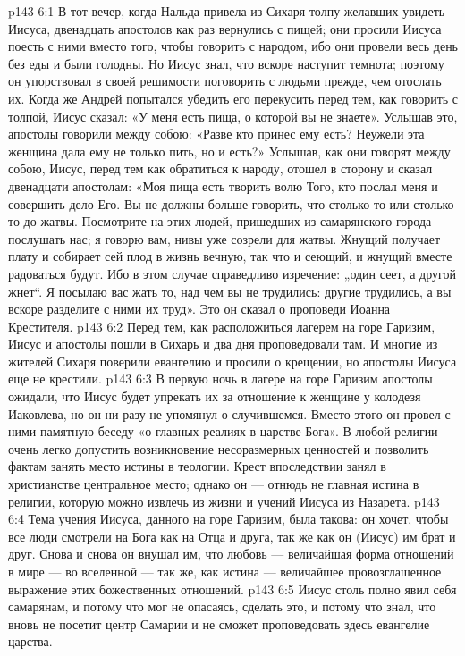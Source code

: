 \vs p143 6:1 В тот вечер, когда Нальда привела из Сихаря толпу желавших увидеть Иисуса, двенадцать апостолов как раз вернулись с пищей; они просили Иисуса поесть с ними вместо того, чтобы говорить с народом, ибо они провели весь день без еды и были голодны. Но Иисус знал, что вскоре наступит темнота; поэтому он упорствовал в своей решимости поговорить с людьми прежде, чем отослать их. Когда же Андрей попытался убедить его перекусить перед тем, как говорить с толпой, Иисус сказал: «У меня есть пища, о которой вы не знаете». Услышав это, апостолы говорили между собою: «Разве кто принес ему есть? Неужели эта женщина дала ему не только пить, но и есть?» Услышав, как они говорят между собою, Иисус, перед тем как обратиться к народу, отошел в сторону и сказал двенадцати апостолам: «Моя пища есть творить волю Того, кто послал меня и совершить дело Его. Вы не должны больше говорить, что столько\hyp{}то или столько\hyp{}то до жатвы. Посмотрите на этих людей, пришедших из самарянского города послушать нас; я говорю вам, нивы уже созрели для жатвы. Жнущий получает плату и собирает сей плод в жизнь вечную, так что и сеющий, и жнущий вместе радоваться будут. Ибо в этом случае справедливо изречение: „один сеет, а другой жнет“. Я посылаю вас жать то, над чем вы не трудились: другие трудились, а вы вскоре разделите с ними их труд». Это он сказал о проповеди Иоанна Крестителя.
\vs p143 6:2 Перед тем, как расположиться лагерем на горе Гаризим, Иисус и апостолы пошли в Сихарь и два дня проповедовали там. И многие из жителей Сихаря поверили евангелию и просили о крещении, но апостолы Иисуса еще не крестили.
\vs p143 6:3 \pc В первую ночь в лагере на горе Гаризим апостолы ожидали, что Иисус будет упрекать их за отношение к женщине у колодезя Иаковлева, но он ни разу не упомянул о случившемся. Вместо этого он провел с ними памятную беседу «о главных реалиях в царстве Бога». В любой религии очень легко допустить возникновение несоразмерных ценностей и позволить фактам занять место истины в теологии. Крест впоследствии занял в христианстве центральное место; однако он --- отнюдь не главная истина в религии, которую можно извлечь из жизни и учений Иисуса из Назарета.
\vs p143 6:4 Тема учения Иисуса, данного на горе Гаризим, была такова: он хочет, чтобы все люди смотрели на Бога как на Отца и друга, так же как он (Иисус) им брат и друг. Снова и снова он внушал им, что любовь --- величайшая форма отношений в мире --- во вселенной --- так же, как истина --- величайшее провозглашенное выражение этих божественных отношений.
\vs p143 6:5 Иисус столь полно явил себя самарянам, и потому что мог не опасаясь, сделать это, и потому что знал, что вновь не посетит центр Самарии и не сможет проповедовать здесь евангелие царства.
